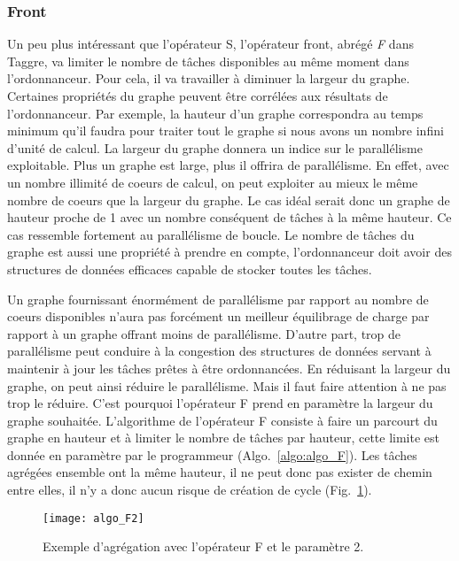 \subsubsection{Front}
Un peu plus intéressant que l'opérateur S, l'opérateur front, abrégé {\em F} dans Taggre, va limiter le nombre de tâches disponibles au même moment dans l'ordonnanceur.
%
Pour cela, il va travailler à diminuer la largeur du graphe.
%
Certaines propriétés du graphe peuvent être corrélées aux résultats de l'ordonnanceur.
%
Par exemple, la hauteur d'un graphe correspondra au temps minimum qu'il faudra pour traiter tout le graphe si nous avons un nombre infini d'unité de calcul.
%
La largeur du graphe donnera un indice sur le parallélisme exploitable.
%
Plus un graphe est large, plus il offrira de parallélisme.
%
En effet, avec un nombre illimité de coeurs de calcul, on peut exploiter au mieux le même nombre de coeurs que la largeur du graphe.
%
Le cas idéal serait donc un graphe de hauteur proche de 1 avec un nombre conséquent de tâches à la même hauteur.
%
Ce cas ressemble fortement au parallélisme de boucle.
%
Le nombre de tâches du graphe est aussi une propriété à prendre en compte, l'ordonnanceur doit avoir des structures de données efficaces capable de stocker toutes les tâches.



Un graphe fournissant énormément de parallélisme par rapport au nombre de coeurs disponibles n'aura pas forcément un meilleur équilibrage de charge par rapport à un graphe offrant moins de parallélisme.
%
D'autre part, trop de parallélisme peut conduire à la congestion des structures de données servant à maintenir à jour les tâches prêtes à être ordonnancées.
%
En réduisant la largeur du graphe, on peut ainsi réduire le parallélisme.
%
Mais il faut faire attention à ne pas trop le réduire.
%
C'est pourquoi l'opérateur F prend en paramètre la largeur du graphe souhaitée.
%
L'algorithme de l'opérateur F consiste à faire un parcourt du graphe en hauteur et à limiter le nombre de tâches par hauteur, cette limite est donnée en paramètre par le programmeur (Algo.~\ref{algo:algo_F}).
%
Les tâches agrégées ensemble ont la même hauteur, il ne peut donc pas exister de chemin entre elles, il n'y a donc aucun risque de création de cycle (Fig.~\ref{fig:algo_F2}).


\begin{figure}[t!]
  \centering
  \texttt{[image: algo\_F2]}
  \caption{Exemple d'agrégation avec l'opérateur F et le paramètre 2.}
  \label{fig:algo_F2}
\end{figure}

